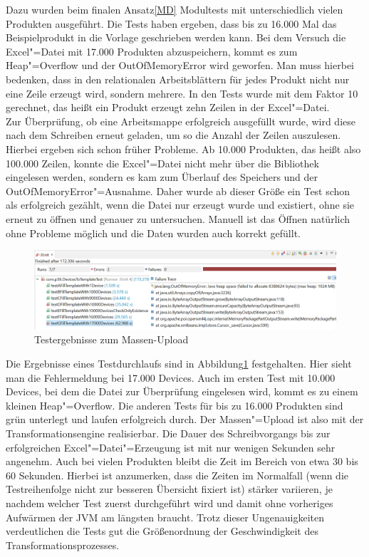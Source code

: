 Dazu wurden beim finalen Ansatz\nbs\ref{MD} Modultests mit unterschiedlich vielen Produkten ausgeführt. Die Tests haben ergeben, dass bis zu 16.000 Mal das Beispielprodukt in die Vorlage geschrieben werden kann. Bei dem Versuch die Excel"=Datei mit 17.000 Produkten abzuspeichern, kommt es zum Heap"=Overflow und der OutOfMemoryError wird geworfen. Man muss hierbei bedenken, dass in den relationalen Arbeitsblättern für jedes Produkt nicht nur eine Zeile erzeugt wird, sondern mehrere. In den Tests wurde mit dem Faktor 10 gerechnet, das heißt ein Produkt erzeugt zehn Zeilen in der Excel"=Datei. \\
Zur Überprüfung, ob eine Arbeitsmappe erfolgreich ausgefüllt wurde, wird diese nach dem Schreiben erneut geladen, um so die Anzahl der Zeilen auszulesen. Hierbei ergeben sich schon früher Probleme. Ab 10.000 Produkten, das heißt also 100.000 Zeilen, konnte die Excel"=Datei nicht mehr über die Bibliothek  eingelesen werden, sondern es kam zum Überlauf des Speichers und der OutOfMemoryError"=Ausnahme. Daher wurde ab dieser Größe ein Test schon als erfolgreich gezählt, wenn die Datei nur erzeugt wurde und existiert, ohne sie erneut zu öffnen und genauer zu untersuchen. Manuell ist das Öffnen natürlich ohne Probleme möglich und die Daten wurden auch korrekt gefüllt. 

\begin{figure}[htbp]
 \centering
 \includegraphics[width=\textwidth]{Bilder/MassUploadTests}
 \caption{Testergebnisse zum Massen-Upload}
 \label{fig:mu}
\end{figure}

Die Ergebnisse eines Testdurchlaufs sind in Abbildung\nbs\ref{fig:mu} festgehalten. Hier sieht man die Fehlermeldung bei 17.000 Devices. Auch im ersten Test mit 10.000 Devices, bei dem die Datei zur Überprüfung eingelesen wird, kommt es zu einem kleinen Heap"=Overflow. Die anderen Tests für bis zu 16.000 Produkten sind grün unterlegt und laufen erfolgreich durch. Der Massen"=Upload ist also mit der Transformationsengine realisierbar. Die Dauer des Schreibvorgangs bis zur erfolgreichen Excel"=Datei"=Erzeugung ist mit nur wenigen Sekunden sehr angenehm. Auch bei vielen Produkten bleibt die Zeit im Bereich von etwa 30 bis 60 Sekunden. Hierbei ist anzumerken, dass die Zeiten im Normalfall (wenn die Testreihenfolge nicht zur besseren Übersicht fixiert ist) stärker variieren, je nachdem welcher Test zuerst durchgeführt wird und damit ohne vorheriges Aufwärmen der JVM am längsten braucht. Trotz dieser Ungenauigkeiten verdeutlichen die Tests gut die Größenordnung der Geschwindigkeit des Transformationsprozesses. 




